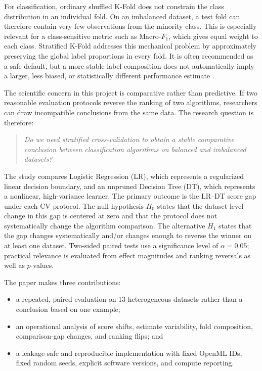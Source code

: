 \documentclass[twoside,11pt]{article}
\newcommand{\macrof}{Macro-$F_1$}
\begin{document}
For classification, ordinary shuffled K-Fold does not constrain the class distribution in an individual fold. On an imbalanced dataset, a test fold can therefore contain very few observations from the minority class. This is especially relevant for a class-sensitive metric such as \macrof, which gives equal weight to each class. Stratified K-Fold addresses this mechanical problem by approximately preserving the global label proportions in every fold. It is often recommended as a safe default, but a more stable label composition does not automatically imply a larger, less biased, or statistically different performance estimate \citep{sklearncv}.

The scientific concern in this project is comparative rather than predictive. If two reasonable evaluation protocols reverse the ranking of two algorithms, researchers can draw incompatible conclusions from the same data. The research question is therefore:

\begin{quote}
\emph{Do we need stratified cross-validation to obtain a stable comparative conclusion between classification algorithms on balanced and imbalanced datasets?}
\end{quote}

The study compares Logistic Regression (LR), which represents a regularized linear decision boundary, and an unpruned Decision Tree (DT), which represents a nonlinear, high-variance learner. The primary outcome is the LR--DT score gap under each CV protocol. The null hypothesis $H_0$ states that the dataset-level change in this gap is centered at zero and that the protocol does not systematically change the algorithm comparison. The alternative $H_1$ states that the gap changes systematically and/or changes enough to reverse the winner on at least one dataset. Two-sided paired tests use a significance level of $\alpha=0.05$; practical relevance is evaluated from effect magnitudes and ranking reversals as well as $p$-values.

The paper makes three contributions:
\begin{itemize}[leftmargin=*,itemsep=2pt,topsep=3pt]
  \item a repeated, paired evaluation on 13 heterogeneous datasets rather than a conclusion based on one example;
  \item an operational analysis of score shifts, estimate variability, fold composition, comparison-gap changes, and ranking flips; and
  \item a leakage-safe and reproducible implementation with fixed OpenML IDs, fixed random seeds, explicit software versions, and compute reporting.
\end{itemize}
\end{document}
